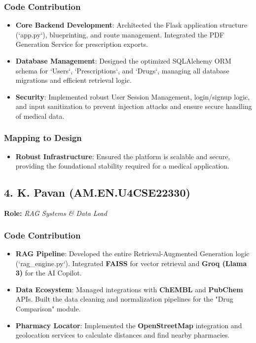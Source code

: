 \documentclass[a4paper,12pt]{article}
\begin{document}
\subsubsection*{Code Contribution}
\begin{itemize}
    \item \textbf{Core Backend Development}: Architected the Flask application structure (`app.py`), blueprinting, and route management. Integrated the PDF Generation Service for prescription exports.
    \item \textbf{Database Management}: Designed the optimized SQLAlchemy ORM schema for `Users`, `Prescriptions`, and `Drugs`, managing all database migrations and efficient retrieval logic.
    \item \textbf{Security}: Implemented robust User Session Management, login/signup logic, and input sanitization to prevent injection attacks and ensure secure handling of medical data.
\end{itemize}

\subsubsection*{Mapping to Design}
\begin{itemize}
    \item \textbf{Robust Infrastructure}: Ensured the platform is scalable and secure, providing the foundational stability required for a medical application.
\end{itemize}

\hrulefill

\subsection*{4. K. Pavan (AM.EN.U4CSE22330)}
\textbf{Role:} \textit{RAG Systems & Data Lead}

\subsubsection*{Code Contribution}
\begin{itemize}
    \item \textbf{RAG Pipeline}: Developed the entire Retrieval-Augmented Generation logic (`rag_engine.py`). Integrated \textbf{FAISS} for vector retrieval and \textbf{Groq (Llama 3)} for the AI Copilot.
    \item \textbf{Data Ecosystem}: Managed integrations with \textbf{ChEMBL} and \textbf{PubChem} APIs. Built the data cleaning and normalization pipelines for the "Drug Comparison" module.
    \item \textbf{Pharmacy Locator}: Implemented the \textbf{OpenStreetMap} integration and geolocation services to calculate distances and find nearby pharmacies.
\end{itemize}
\end{document}
